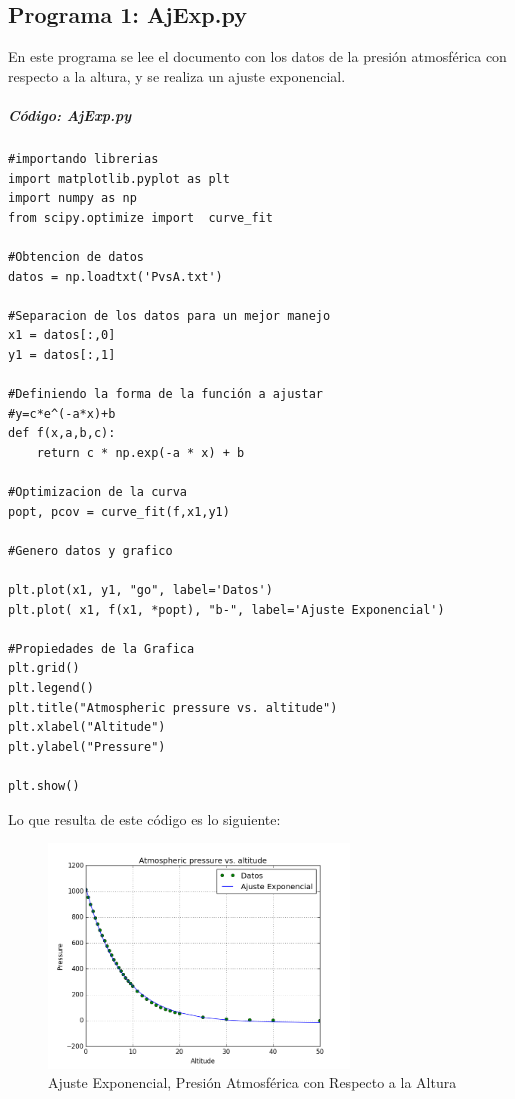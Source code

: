 \documentclass[12pt]{article}
\begin{document}
\subsection{Programa 1: AjExp.py}
En este programa se lee el documento con los datos de la presión atmosférica con respecto a la altura\cite{Da2}, y se realiza un ajuste exponencial.

\subparagraph{Código: AjExp.py}
\begin{verbatim}
#importando librerias
import matplotlib.pyplot as plt
import numpy as np
from scipy.optimize import  curve_fit

#Obtencion de datos
datos = np.loadtxt('PvsA.txt')

#Separacion de los datos para un mejor manejo
x1 = datos[:,0]
y1 = datos[:,1] 

#Definiendo la forma de la función a ajustar
#y=c*e^(-a*x)+b
def f(x,a,b,c):
    return c * np.exp(-a * x) + b

#Optimizacion de la curva
popt, pcov = curve_fit(f,x1,y1)

#Genero datos y grafico

plt.plot(x1, y1, "go", label='Datos')
plt.plot( x1, f(x1, *popt), "b-", label='Ajuste Exponencial')

#Propiedades de la Grafica
plt.grid()
plt.legend()
plt.title("Atmospheric pressure vs. altitude")
plt.xlabel("Altitude")
plt.ylabel("Pressure")

plt.show()
\end{verbatim}
Lo que resulta de este código es lo siguiente:
\begin{figure}[H]
	\centering
	\includegraphics[width=8cm]{AjusteExp.png}
	\caption{Ajuste Exponencial, Presión Atmosférica con Respecto a la Altura}
\end{figure}

\pagebreak
\end{document}
